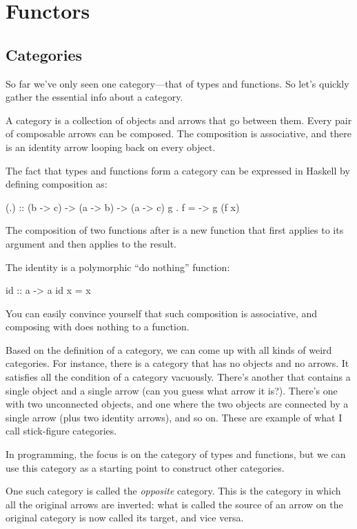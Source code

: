 \documentclass[DaoFP]{subfiles}
\begin{document}
\setcounter{chapter}{7}

\chapter{Functors}
\section{Categories}

So far we've only seen one category---that of types and functions. So let's quickly gather the essential info about a category.

A category is a collection of objects and arrows that go between them. Every pair of composable arrows can be composed. The composition is associative, and there is an identity arrow looping back on every object.

The fact that types and functions form a category can be expressed in Haskell by defining composition as:
\begin{haskell}
(.) :: (b -> c) -> (a -> b) -> (a -> c)
g . f = \x -> g (f x)
\end{haskell}
The composition of two functions  after  is a new function that first applies  to its argument and then applies  to the result.

The identity is a polymorphic ``do nothing'' function:
\begin{haskell}
id :: a -> a
id x = x
\end{haskell}
You can easily convince yourself that such composition is associative, and composing with  does nothing to a function.

Based on the definition of a category, we can come up with all kinds of weird categories. For instance, there is a category that has no objects and no arrows. It satisfies all the condition of a category vacuously. There's another that contains a single object and a single arrow (can you guess what arrow it is?). There's one with two unconnected objects, and one where the two objects are connected by a single arrow (plus two identity arrows), and so on. These are example of what I call stick-figure categories.

 In programming, the focus is on the category of types and functions, but we can use this category as a starting point to construct other categories. 
 
One such category is called the \emph{opposite} category. This is the category in which all the original arrows are inverted: what is called the source of an arrow on the original category is now called its target, and vice versa. 
\end{document}
